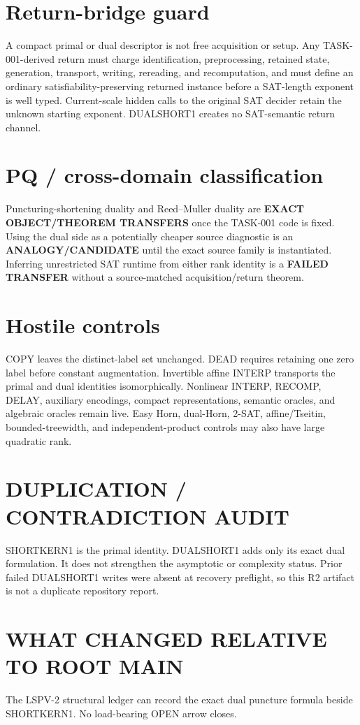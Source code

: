 \documentclass[11pt]{article}
\begin{document}
\section*{Return-bridge guard}
A compact primal or dual descriptor is not free acquisition or setup. Any TASK-001-derived return must charge identification, preprocessing, retained state, generation, transport, writing, rereading, and recomputation, and must define an ordinary satisfiability-preserving returned instance before a SAT-length exponent is well typed. Current-scale hidden calls to the original SAT decider retain the unknown starting exponent. DUALSHORT1 creates no SAT-semantic return channel.

\section*{PQ / cross-domain classification}
Puncturing-shortening duality and Reed--Muller duality are \textbf{EXACT OBJECT/THEOREM TRANSFERS} once the TASK-001 code is fixed. Using the dual side as a potentially cheaper source diagnostic is an \textbf{ANALOGY/CANDIDATE} until the exact source family is instantiated. Inferring unrestricted SAT runtime from either rank identity is a \textbf{FAILED TRANSFER} without a source-matched acquisition/return theorem.

\section*{Hostile controls}
COPY leaves the distinct-label set unchanged. DEAD requires retaining one zero label before constant augmentation. Invertible affine INTERP transports the primal and dual identities isomorphically. Nonlinear INTERP, RECOMP, DELAY, auxiliary encodings, compact representations, semantic oracles, and algebraic oracles remain live. Easy Horn, dual-Horn, 2-SAT, affine/Tseitin, bounded-treewidth, and independent-product controls may also have large quadratic rank.

\section*{DUPLICATION / CONTRADICTION AUDIT}
SHORTKERN1 is the primal identity. DUALSHORT1 adds only its exact dual formulation. It does not strengthen the asymptotic or complexity status. Prior failed DUALSHORT1 writes were absent at recovery preflight, so this R2 artifact is not a duplicate repository report.

\section*{WHAT CHANGED RELATIVE TO ROOT MAIN}
The LSPV-2 structural ledger can record the exact dual puncture formula beside SHORTKERN1. No load-bearing OPEN arrow closes.
\end{document}
